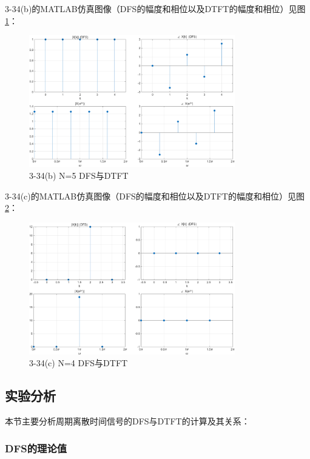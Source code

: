 \documentclass[UTF8,12pt,a4paper]{ctexart}
\begin{document}
3-34(b)的MATLAB仿真图像（DFS的幅度和相位以及DTFT的幅度和相位）见图\ref{fig:3-34b}：

\begin{figure}[htbp]
    \centering
    \includegraphics[width=0.8\textwidth]{3-34(b) N=5.png}
    \caption{3-34(b) N=5 DFS与DTFT}
    \label{fig:3-34b}
\end{figure}

3-34(c)的MATLAB仿真图像（DFS的幅度和相位以及DTFT的幅度和相位）见图\ref{fig:3-34c}：

\begin{figure}[htbp]
    \centering
    \includegraphics[width=0.8\textwidth]{3-34(c) N=4.png}
    \caption{3-34(c) N=4 DFS与DTFT}
    \label{fig:3-34c}
\end{figure}

\subsection{实验分析}

本节主要分析周期离散时间信号的DFS与DTFT的计算及其关系：

\subsubsection{DFS的理论值}
\end{document}
